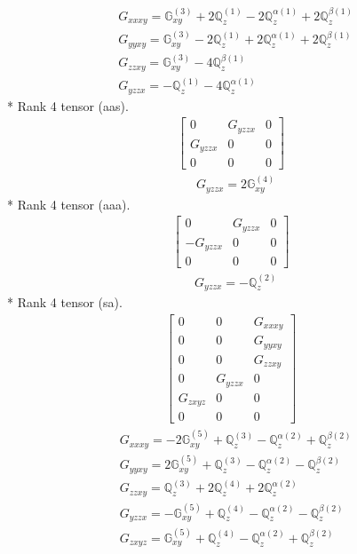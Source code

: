 \documentclass[fleqn,8pt,landscape]{jsarticle}
\begin{document}
\begin{align*}
& G_{xxxy} = \mathbb{G}_{xy}^{(3)} + 2 \mathbb{Q}_{z}^{(1)} - 2 \mathbb{Q}_{z}^{\alpha(1)} + 2 \mathbb{Q}_{z}^{\beta(1)} \\
& G_{yyxy} = \mathbb{G}_{xy}^{(3)} - 2 \mathbb{Q}_{z}^{(1)} + 2 \mathbb{Q}_{z}^{\alpha(1)} + 2 \mathbb{Q}_{z}^{\beta(1)} \\
& G_{zzxy} = \mathbb{G}_{xy}^{(3)} - 4 \mathbb{Q}_{z}^{\beta(1)} \\
& G_{yzzx} = - \mathbb{Q}_{z}^{(1)} - 4 \mathbb{Q}_{z}^{\alpha(1)}
\end{align*}
* Rank 4 tensor (aas).
\begin{align*}
\begin{bmatrix} 0 & G_{yzzx} & 0 \\ G_{yzzx} & 0 & 0 \\ 0 & 0 & 0 \end{bmatrix}
\end{align*}
\begin{align*}
& G_{yzzx} = 2 \mathbb{G}_{xy}^{(4)}
\end{align*}
* Rank 4 tensor (aaa).
\begin{align*}
\begin{bmatrix} 0 & G_{yzzx} & 0 \\ - G_{yzzx} & 0 & 0 \\ 0 & 0 & 0 \end{bmatrix}
\end{align*}
\begin{align*}
& G_{yzzx} = - \mathbb{Q}_{z}^{(2)}
\end{align*}
* Rank 4 tensor (sa).
\begin{align*}
\begin{bmatrix} 0 & 0 & G_{xxxy} \\ 0 & 0 & G_{yyxy} \\ 0 & 0 & G_{zzxy} \\ 0 & G_{yzzx} & 0 \\ G_{zxyz} & 0 & 0 \\ 0 & 0 & 0 \end{bmatrix}
\end{align*}
\begin{align*}
& G_{xxxy} = - 2 \mathbb{G}_{xy}^{(5)} + \mathbb{Q}_{z}^{(3)} - \mathbb{Q}_{z}^{\alpha(2)} + \mathbb{Q}_{z}^{\beta(2)} \\
& G_{yyxy} = 2 \mathbb{G}_{xy}^{(5)} + \mathbb{Q}_{z}^{(3)} - \mathbb{Q}_{z}^{\alpha(2)} - \mathbb{Q}_{z}^{\beta(2)} \\
& G_{zzxy} = \mathbb{Q}_{z}^{(3)} + 2 \mathbb{Q}_{z}^{(4)} + 2 \mathbb{Q}_{z}^{\alpha(2)} \\
& G_{yzzx} = - \mathbb{G}_{xy}^{(5)} + \mathbb{Q}_{z}^{(4)} - \mathbb{Q}_{z}^{\alpha(2)} - \mathbb{Q}_{z}^{\beta(2)} \\
& G_{zxyz} = \mathbb{G}_{xy}^{(5)} + \mathbb{Q}_{z}^{(4)} - \mathbb{Q}_{z}^{\alpha(2)} + \mathbb{Q}_{z}^{\beta(2)}
\end{align*}
\end{document}
